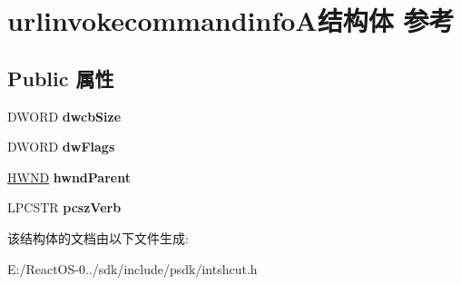 \hypertarget{structurlinvokecommandinfo_a}{}\section{urlinvokecommandinfo\+A结构体 参考}
\label{structurlinvokecommandinfo_a}
\subsection*{Public 属性}
\begin{DoxyCompactItemize}
\item 
\mbox{\label{structurlinvokecommandinfo_a_a5a48136167a53b2515c25fac9da1860e}} 
D\+W\+O\+RD {\bfseries dwcb\+Size}
\item 
\mbox{\label{structurlinvokecommandinfo_a_a197fe69bc4621af51740aecefd72c30c}} 
D\+W\+O\+RD {\bfseries dw\+Flags}
\item 
\mbox{\label{structurlinvokecommandinfo_a_ad143bef753d7d5d2cf473104631aa4bc}} 
\hyperlink{interfacevoid}{H\+W\+ND} {\bfseries hwnd\+Parent}
\item 
\mbox{\label{structurlinvokecommandinfo_a_a85f808244a78ba334dd43f351401b182}} 
L\+P\+C\+S\+TR {\bfseries pcsz\+Verb}
\end{DoxyCompactItemize}


该结构体的文档由以下文件生成\+:\begin{DoxyCompactItemize}
\item 
E\+:/\+React\+O\+S-\/0../sdk/include/psdk/intshcut.\+h\end{DoxyCompactItemize}
